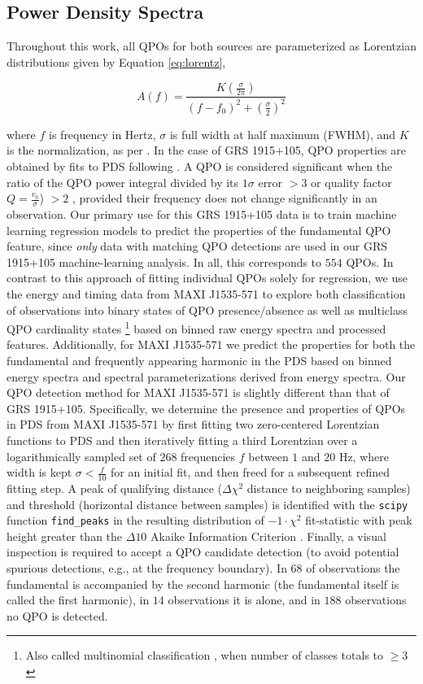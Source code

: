 \documentclass[fleqn,usenatbib,twocolumn]{mnras}%
\begin{document}
\subsection{Power Density Spectra}

Throughout this work, all QPOs for both sources are parameterized as Lorentzian distributions given by Equation \ref{eq:lorentz},

\begin{equation}
    A(f)=\frac{K(\frac{\sigma}{2\pi})}{(f-f_0)^2+(\frac{\sigma}{2})^2}
    \label{eq:lorentz}
\end{equation}

\noindent where $f$ is frequency in Hertz, $\sigma$ is full width at half maximum (FWHM), and $K$ is the normalization, as per \cite{XSPEC1999}. In the case of GRS 1915+105, QPO properties are obtained by fits to PDS following \cite{GRSDATAPAPER}. A QPO is considered significant when the ratio of the QPO power integral divided by its $1\sigma$ error $>3$ or quality factor $Q=\frac{v_0}{\sigma}$) $>2$ \citep{quality1999}, provided their frequency does not change significantly in an observation. Our primary use for this GRS 1915+105 data is to train machine learning regression models to predict the properties of the fundamental QPO feature, since \textit{only} data with matching QPO detections are used in our GRS 1915+105 machine-learning analysis. In all, this corresponds to $554$ QPOs. In contrast to this approach of fitting individual QPOs solely for regression, we use the energy and timing data from MAXI J1535-571 to explore both classification of observations into binary states of QPO presence/absence as well as multiclass QPO cardinality states \footnote{Also called multinomial classification \citep{bouveyron2019model}, when number of classes totals to $\geq 3$} based on binned raw energy spectra and processed features. Additionally, for MAXI J1535-571 we predict the properties for both the fundamental and frequently appearing harmonic in the PDS based on binned energy spectra and spectral parameterizations derived from energy spectra. Our QPO detection method for MAXI J1535-571 is slightly different than that of GRS 1915+105. Specifically, we determine the presence and properties of QPOs in PDS from MAXI J1535-571 by first fitting two zero-centered Lorentzian functions to PDS and then iteratively fitting a third Lorentzian over a logarithmically sampled set of $268$ frequencies $f$  between $1$ and $20$ Hz, where width is kept $\sigma<\frac{f}{10}$ for an initial fit, and then freed for a subsequent refined fitting step. A peak of qualifying distance ($\Delta \chi^2$ distance to neighboring samples) and threshold (horizontal distance between samples) is identified with the \texttt{scipy} function \texttt{find\_peaks} \citep{scikit-learn} in the resulting distribution of $-1\cdot\chi^2$ fit-statistic with peak height greater than the $\Delta10$ Akaike Information Criterion \citep{Akaike1998}. Finally, a visual inspection is required to accept a QPO candidate detection (to avoid potential spurious detections, e.g., at the frequency boundary). In $68$ of observations the fundamental is accompanied by the second harmonic (the fundamental itself is called the first harmonic), in $14$ observations it is alone, and in $188$ observations no QPO is detected. 
\end{document}

